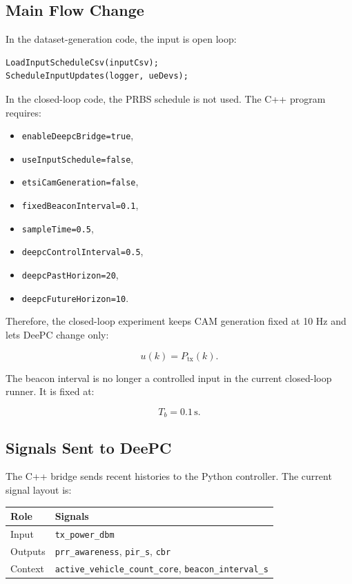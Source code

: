 \documentclass[11pt,a4paper]{article}
\begin{document}
\subsection{Main Flow Change}

In the dataset-generation code, the input is open loop:

\begin{lstlisting}[style=cppstyle]
LoadInputScheduleCsv(inputCsv);
ScheduleInputUpdates(logger, ueDevs);
\end{lstlisting}

In the closed-loop code, the PRBS schedule is not used. The C++ program requires:

\begin{itemize}
    \item \texttt{enableDeepcBridge=true},
    \item \texttt{useInputSchedule=false},
    \item \texttt{etsiCamGeneration=false},
    \item \texttt{fixedBeaconInterval=0.1},
    \item \texttt{sampleTime=0.5},
    \item \texttt{deepcControlInterval=0.5},
    \item \texttt{deepcPastHorizon=20},
    \item \texttt{deepcFutureHorizon=10}.
\end{itemize}

Therefore, the closed-loop experiment keeps CAM generation fixed at 10 Hz and lets DeePC change only:

\begin{equation}
u(k) = P_{\mathrm{tx}}(k).
\end{equation}

The beacon interval is no longer a controlled input in the current closed-loop runner. It is fixed at:

\begin{equation}
T_b = 0.1\,\mathrm{s}.
\end{equation}

\subsection{Signals Sent to DeePC}

The C++ bridge sends recent histories to the Python controller. The current signal layout is:

\begin{center}
\begin{tabular}{ll}
\toprule
Role & Signals \\
\midrule
Input & \texttt{tx\_power\_dbm} \\
Outputs & \texttt{prr\_awareness}, \texttt{pir\_s}, \texttt{cbr} \\
Context & \texttt{active\_vehicle\_count\_core}, \texttt{beacon\_interval\_s} \\
\bottomrule
\end{tabular}
\end{center}
\end{document}
